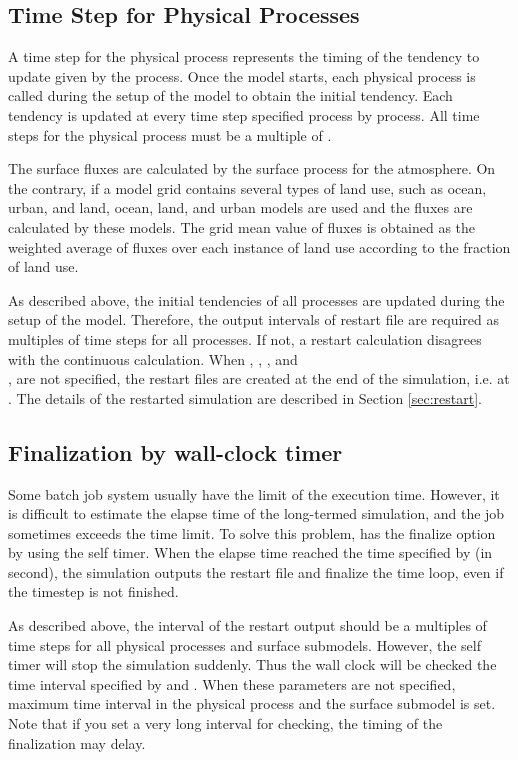 \subsection{Time Step for Physical Processes}
A time step for the physical process represents the timing of the tendency to update given by the process. Once the model starts, each physical process is called during the setup of the model to obtain the initial tendency. Each tendency is updated at every time step specified process by process.
All time steps for the physical process must be a multiple of .

The surface fluxes are calculated by the surface process for the atmosphere.
On the contrary, if a model grid contains several types of land use, such as ocean, urban, and land,
ocean, land, and urban models are used and the fluxes are calculated by these models.
The grid mean value of fluxes is obtained as the weighted average of fluxes over each instance of land use according to the fraction of land use.

As described above, the initial tendencies of all processes are updated during the setup of the model.
Therefore, the output intervals of restart file are required as multiples of time steps for all processes.
If not, a restart calculation disagrees with the continuous calculation.
When , ,  , and\\ , are not specified,
the restart files are created at the end of the simulation, i.e. at .
The details of the restarted simulation are described in Section \ref{sec:restart}.

\subsection{Finalization by wall-clock timer} \label{subsec:cfl_check}

Some batch job system usually have the limit of the execution time. However, it is difficult to estimate the elapse time of the long-termed simulation, and the job sometimes exceeds the time limit.
To solve this problem, \scalerm has the finalize option by using the self timer.
When the elapse time reached the time specified by  (in second), the simulation outputs the restart file and finalize the time loop, even if the timestep is not finished.

As described above, the interval of the restart output should be a multiples of time steps for all physical processes and surface submodels. However, the self timer will stop the simulation suddenly.
Thus the wall clock will be checked the time interval specified by  and . When these parameters are not specified, maximum time interval in the physical process and the surface submodel is set.
Note that if you set a very long interval for checking, the timing of the finalization may delay.

